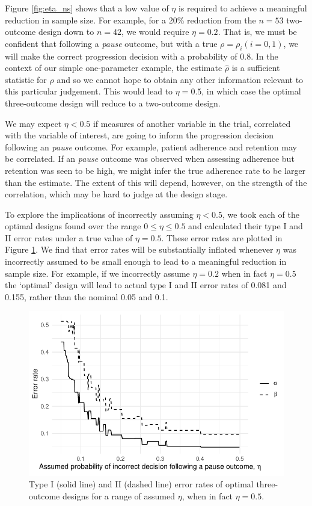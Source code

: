 \documentclass{bmcart}
\begin{document}
Figure \ref{fig:eta_ns} shows that a low value of $\eta$ is required to achieve a meaningful reduction in sample size. For example, for a 20\% reduction from the $n = 53$ two-outcome design down to $n = 42$, we would require $\eta = 0.2$. That is, we must be confident that following a \emph{pause} outcome, but with a true $\rho = \rho_i (i = 0,1)$, we will make the correct progression decision with a probability of 0.8. In the context of our simple one-parameter example, the estimate $\hat{\rho}$ is a sufficient statistic for $\rho$ and so we cannot hope to obtain any other information relevant to this particular judgement. This would lead to $\eta = 0.5$, in which case the optimal three-outcome design will reduce to a two-outcome design.

We may expect $\eta < 0.5$ if measures of another variable in the trial, correlated with the variable of interest, are going to inform the progression decision following an \emph{pause} outcome. For example, patient adherence and retention may be correlated. If an \emph{pause} outcome was observed when assessing adherence but retention was seen to be high, we might infer the true adherence rate to be larger than the estimate. The extent of this will depend, however, on the strength of the correlation, which may be hard to judge at the design stage. 

To explore the implications of incorrectly assuming $\eta < 0.5$, we took each of the optimal designs found over the range $0 \leq \eta \leq 0.5$ and calculated their type I and II error rates under a true value of $\eta = 0.5$. These error rates are plotted in Figure \ref{fig:eta_true_ocs}. We find that error rates will be substantially inflated whenever $\eta$ was incorrectly assumed to be small enough to lead to a meaningful reduction in sample size. For example, if we incorrectly assume $\eta = 0.2$ when in fact $\eta = 0.5$ the `optimal' design will lead to actual type I and II error rates of 0.081 and 0.155, rather than the nominal 0.05 and 0.1.

\begin{figure}
\centering
\includegraphics[scale=0.8]{./figures/eta_true_ocs}
\caption{Type I (solid line) and II (dashed line) error rates of optimal three-outcome designs for a range of assumed $\eta$, when in fact $\eta = 0.5$.}
\label{fig:eta_true_ocs}
\end{figure}
\end{document}
